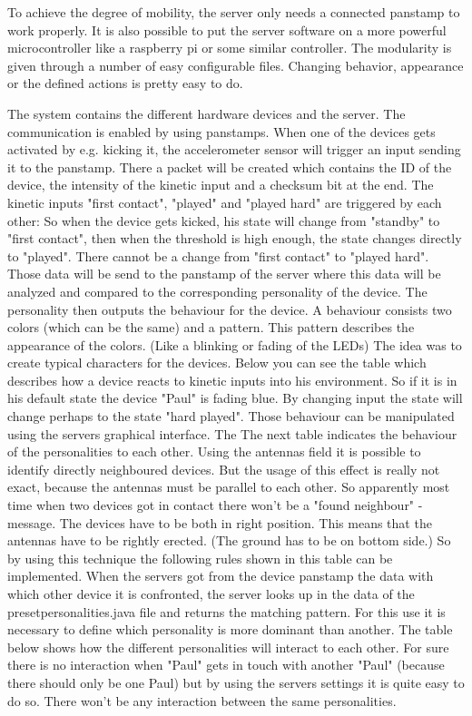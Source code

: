 To achieve the degree of mobility, the server only needs a connected panstamp to work properly. It is also possible to put the server software on a more powerful microcontroller like a raspberry pi or some similar controller.
The modularity is given through a number of easy configurable files. Changing behavior, appearance or the defined actions is pretty easy to do.

The system contains the different hardware devices and the server. The communication is enabled by using panstamps. When one of the devices gets activated by e.g. kicking it, the accelerometer sensor will trigger an input sending it to the panstamp. There a packet will be created which contains the ID of the device, the intensity of the kinetic input and a checksum bit at the end.
The kinetic inputs "first contact", "played" and "played hard" are triggered by each other:
So when the device gets kicked, his state will change from "standby" to "first contact", then when the threshold is high enough, the state changes directly to "played". There cannot be a change from "first contact" to "played hard". 
Those data will be send to the panstamp of the server where this data will be analyzed and compared to the corresponding personality of the device. The personality then outputs the behaviour for the device. A behaviour consists two colors (which can be the same) and a pattern. This pattern describes the appearance of the colors. (Like a blinking or fading of the LEDs)
The idea was to create typical characters for the devices. Below you can see the table which describes how a device reacts to kinetic inputs into his environment. So if it is in his default state the device "Paul" is fading blue. By changing input the state will change perhaps to the state "hard played". Those behaviour can be manipulated using the servers graphical interface. The %
The next table indicates the behaviour of the personalities to each other. Using the antennas field  it is possible to identify directly neighboured devices. But the usage of this effect is really not exact, because the antennas must be parallel to each other. So apparently most time when two devices got in contact there won't be a "found neighbour" - message. The devices have to be both in right position. This means that the antennas have to be rightly erected. (The ground has to be on bottom side.)   
So by using this technique the following rules shown in this table can be implemented.
When the servers got from the device panstamp the data with which other device it is confronted, the server looks up in the data of the presetpersonalities.java file and returns the matching pattern. For this use it is necessary to define which personality is more dominant than another.
The table below shows how the different personalities will interact to each other.
For sure there is no interaction when "Paul" gets in touch with another "Paul" (because there should only be one Paul) but by using the servers settings it is quite easy to do so. There won't be any interaction between the same personalities.

